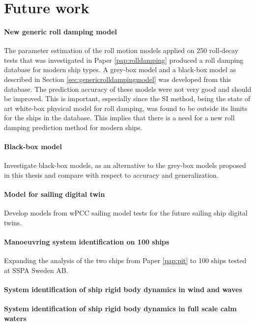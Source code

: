 \chapter{Future work\label{ch:future_work}}

\subsubsection*{New generic roll damping model}
The parameter estimation of the roll motion models applied on 250 roll-decay tests that was investigated in Paper \ref{pap:rolldamping} produced a roll damping database for modern ship types. A grey-box model and a black-box model as described in Section \ref{sec:genericrolldampingmodel} was developed from this database. The prediction accuracy of these models were not very good and should be improved. This is important, especially since the SI method, being the state of art white-box physical model for roll damping, was found to be outside its limits for the ships in the database. This implies that there is a need for a new roll damping prediction method for modern ships.  

\subsubsection*{Black-box model}
Investigate black-box models, as an alternative to the grey-box models proposed in this thesis and compare with respect to accuracy and generalization.

\subsubsection*{Model for sailing digital twin}
Develop models from wPCC sailing model tests for the future sailing ship digital twins.

\subsubsection*{Manoeuvring system identification on 100 ships}
Expanding the analysis of the two ships from Paper \ref{pap:pit} to 100 ships tested at SSPA Sweden AB.

\subsubsection*{System identification of ship rigid body dynamics in wind and waves}

\subsubsection*{System identification of ship rigid body dynamics in full scale calm waters}
